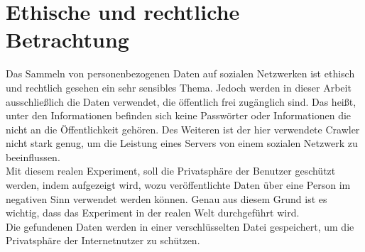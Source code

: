 \chapter{Ethische und rechtliche Betrachtung}  %
\label{cha:EthischeUndRechtlicheBetrachtung} %
Das Sammeln von personenbezogenen Daten auf sozialen Netzwerken ist ethisch und rechtlich gesehen ein sehr sensibles Thema. Jedoch werden in dieser Arbeit ausschließlich die Daten verwendet, die öffentlich frei zugänglich sind. Das heißt, unter den Informationen befinden sich keine Passwörter oder Informationen die nicht an die Öffentlichkeit gehören. Des Weiteren ist der hier verwendete Crawler nicht stark genug, um die Leistung eines Servers von einem sozialen Netzwerk zu beeinflussen.\\
Mit diesem realen Experiment, soll die Privatsphäre der Benutzer geschützt werden, indem aufgezeigt wird, wozu veröffentlichte Daten über eine Person im negativen Sinn verwendet werden können. Genau aus diesem Grund ist es wichtig, dass das Experiment in der realen Welt durchgeführt wird.\\
Die gefundenen Daten werden in einer verschlüsselten Datei gespeichert, um die Privatsphäre der Internetnutzer zu schützen.

